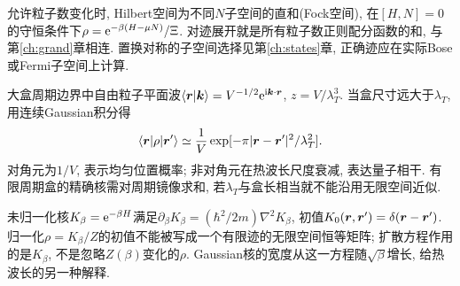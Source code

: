 允许粒子数变化时, Hilbert空间为不同$N$子空间的直和(Fock空间), 在$[H,N]=0$的守恒条件下$\rho=\mathrm e^{-\beta(H-\mu N)}/\Xi$. 对迹展开就是所有粒子数正则配分函数的和, 与第\ref{ch:grand}章相连. 置换对称的子空间选择见第\ref{ch:states}章, 正确迹应在实际Bose或Fermi子空间上计算.

大盒周期边界中自由粒子平面波$\langle\boldsymbol{r}|\boldsymbol{k}\rangle=V^{-1/2}\mathrm e^{\mathrm i\boldsymbol{k}\cdot\boldsymbol{r}}$, $z=V/\lambda_T^3$. 当盒尺寸远大于$\lambda_T$, 用连续Gaussian积分得
\[
\langle\boldsymbol{r}|\rho|\boldsymbol{r}'\rangle\simeq\frac1V\exp[-\pi|\boldsymbol{r}-\boldsymbol{r}'|^2/\lambda_T^2].
\]
对角元为$1/V$, 表示均匀位置概率; 非对角元在热波长尺度衰减, 表达量子相干. 有限周期盒的精确核需对周期镜像求和, 若$\lambda_T$与盒长相当就不能沿用无限空间近似.

未归一化核$K_\beta=\mathrm e^{-\beta H}$满足$\partial_\beta K_\beta=(\hbar^2/2m)\nabla^2K_\beta$, 初值$K_0(\boldsymbol{r},\boldsymbol{r}')=\delta(\boldsymbol{r}-\boldsymbol{r}')$. 归一化$\rho=K_\beta/Z$的初值不能被写成一个有限迹的无限空间恒等矩阵; 扩散方程作用的是$K_\beta$, 不是忽略$Z(\beta)$变化的$\rho$. Gaussian核的宽度从这一方程随$\sqrt\beta$增长, 给热波长的另一种解释.
